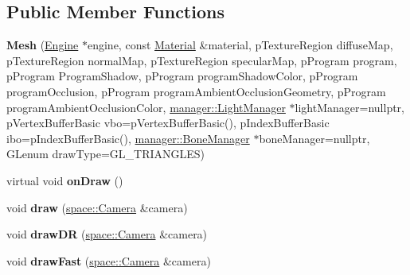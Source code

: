 \subsection*{Public Member Functions}
\begin{DoxyCompactItemize}
\item 
\hypertarget{classfillwave_1_1models_1_1Mesh_a0d95cbd74a78ef53128f02f7861cee39}{}{\bfseries Mesh} (\hyperlink{classfillwave_1_1Engine}{Engine} $\ast$engine, const \hyperlink{classfillwave_1_1models_1_1Material}{Material} \&material, p\+Texture\+Region diffuse\+Map, p\+Texture\+Region normal\+Map, p\+Texture\+Region specular\+Map, p\+Program program, p\+Program Program\+Shadow, p\+Program program\+Shadow\+Color, p\+Program program\+Occlusion, p\+Program program\+Ambient\+Occlusion\+Geometry, p\+Program program\+Ambient\+Occlusion\+Color, \hyperlink{classfillwave_1_1manager_1_1LightManager}{manager\+::\+Light\+Manager} $\ast$light\+Manager=nullptr, p\+Vertex\+Buffer\+Basic vbo=p\+Vertex\+Buffer\+Basic(), p\+Index\+Buffer\+Basic ibo=p\+Index\+Buffer\+Basic(), \hyperlink{classfillwave_1_1manager_1_1BoneManager}{manager\+::\+Bone\+Manager} $\ast$bone\+Manager=nullptr, G\+Lenum draw\+Type=G\+L\+\_\+\+T\+R\+I\+A\+N\+G\+L\+E\+S)\label{classfillwave_1_1models_1_1Mesh_a0d95cbd74a78ef53128f02f7861cee39}

\item 
\hypertarget{classfillwave_1_1models_1_1Mesh_a90b50f39d7b3c85240bfa4abc109c611}{}virtual void {\bfseries on\+Draw} ()\label{classfillwave_1_1models_1_1Mesh_a90b50f39d7b3c85240bfa4abc109c611}

\item 
\hypertarget{classfillwave_1_1models_1_1Mesh_a2a1b2eba36669467e9565052e2a3bab0}{}void {\bfseries draw} (\hyperlink{classfillwave_1_1space_1_1Camera}{space\+::\+Camera} \&camera)\label{classfillwave_1_1models_1_1Mesh_a2a1b2eba36669467e9565052e2a3bab0}

\item 
\hypertarget{classfillwave_1_1models_1_1Mesh_a5d6f4543c45f5cdb5afed43dfb06efe7}{}void {\bfseries draw\+D\+R} (\hyperlink{classfillwave_1_1space_1_1Camera}{space\+::\+Camera} \&camera)\label{classfillwave_1_1models_1_1Mesh_a5d6f4543c45f5cdb5afed43dfb06efe7}

\item 
\hypertarget{classfillwave_1_1models_1_1Mesh_a06b550cab08ecdf422efcc0f54311804}{}void {\bfseries draw\+Fast} (\hyperlink{classfillwave_1_1space_1_1Camera}{space\+::\+Camera} \&camera)\label{classfillwave_1_1models_1_1Mesh_a06b550cab08ecdf422efcc0f54311804}


\end{DoxyCompactItemize}
